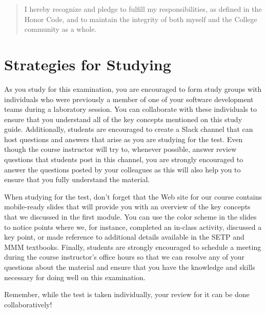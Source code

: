 \documentclass[11pt]{article}
\begin{document}
\begin{quote}

  I hereby recognize and pledge to fulfill my responsibilities, as defined in
  the Honor Code, and to maintain the integrity of both myself and the College
  community as a whole.

\end{quote}

\section*{Strategies for Studying}

As you study for this examination, you are encouraged to form study groups with
individuals who were previously a member of one of your software development
teams during a laboratory session. You can collaborate with these individuals to
ensure that you understand all of the key concepts mentioned on this study
guide. Additionally, students are encouraged to create a Slack channel that can
host questions and answers that arise as you are studying for the test. Even
though the course instructor will try to, whenever possible, answer review
questions that students post in this channel, you are strongly encouraged to
answer the questions posted by your colleagues as this will also help you to
ensure that you fully understand the material.

When studying for the test, don't forget that the Web site for our course
contains mobile-ready slides that will provide you with an overview of the key
concepts that we discussed in the first module. You can use the color scheme in
the slides to notice points where we, for instance, completed an in-class
activity, discussed a key point, or made reference to additional details
available in the SETP and MMM textbooks. Finally, students are strongly
encouraged to schedule a meeting during the course instructor's office hours so
that we can resolve any of your questions about the material and ensure that you
have the knowledge and skills necessary for doing well on this examination.

Remember, while the test is taken individually, your review for it can be done
collaboratively!
\end{document}
